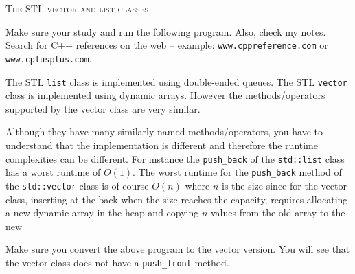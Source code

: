 \textsc{The STL vector and list classes}

Make sure your study and run the following program.
Also, check my notes.
Search for C++ references on the web -- example: \verb!www.cppreference.com!
or \verb!www.cplusplus.com!.

{\footnotesize
{}
}

The STL \verb!list! class is implemented using double-ended queues.
The STL \verb!vector! class is implemented using dynamic arrays.
However the methods/operators supported by the vector class are very similar.

Although they have many similarly named methods/operators,
you have to understand that the implementation is different and therefore
the runtime complexities can be different.
For instance the \verb!push_back! of the \verb!std::list!
class has a worst runtime of $O(1)$.
The worst runtime for the \verb!push_back! method of
the \verb!std::vector! class is of course $O(n)$
where $n$ is the size since for the vector class, inserting at the back
when the size reaches the capacity, requires allocating a new dynamic array
in the heap and copying $n$ values from the old array to the new

Make sure you convert the above program to the vector version.
You will see that the vector class does not have a \verb!push_front! method.

